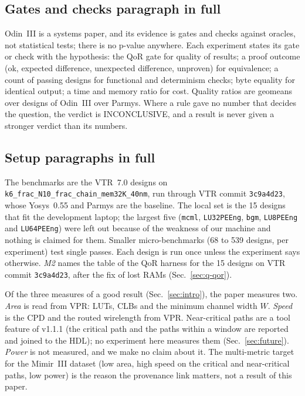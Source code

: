\documentclass[conference]{IEEEtran}
\newcommand{\code}[1]{\texttt{#1}}
\begin{document}
\subsection{Gates and checks paragraph in full}

Odin~III is a systems paper, and its evidence is gates and checks against oracles, not statistical tests; there is no p-value anywhere. Each experiment states its gate or check with the hypothesis: the QoR gate for quality of results; a proof outcome (ok, expected difference, unexpected difference, unproven) for equivalence; a count of passing designs for functional and determinism checks; byte equality for identical output; a time and memory ratio for cost. Quality ratios are geomeans over designs of Odin~III over Parmys. Where a rule gave no number that decides the question, the verdict is INCONCLUSIVE, and a result is never given a stronger verdict than its numbers.

\subsection{Setup paragraphs in full}

The benchmarks are the VTR~7.0 designs on \code{k6\_frac\_N10\_frac\_chain\_mem32K\_40nm}, run through VTR commit \code{3c9a4d23}, whose Yosys~0.55 and Parmys are the baseline. The local set is the 15 designs that fit the development laptop; the largest five (\code{mcml}, \code{LU32PEEng}, \code{bgm}, \code{LU8PEEng} and \code{LU64PEEng}) were left out because of the weakness of our machine and nothing is claimed for them. Smaller micro-benchmarks (68 to 539 designs, per experiment) test single passes. Each design is run once unless the experiment says otherwise. \emph{M2} names the table of the QoR harness for the 15 designs on VTR commit \code{3c9a4d23}, after the fix of lost RAMs (Sec.~\ref{sec:q-qor}).

Of the three measures of a good result (Sec.~\ref{sec:intro}), the paper measures two. \emph{Area} is read from VPR: LUTs, CLBs and the minimum channel width $W$. \emph{Speed} is the CPD and the routed wirelength from VPR. Near-critical paths are a tool feature of v1.1.1 (the critical path and the paths within a window are reported and joined to the HDL); no experiment here measures them (Sec.~\ref{sec:future}). \emph{Power} is not measured, and we make no claim about it. The multi-metric target for the Mimir~III dataset (low area, high speed on the critical and near-critical paths, low power) is the reason the provenance link matters, not a result of this paper.
\end{document}
